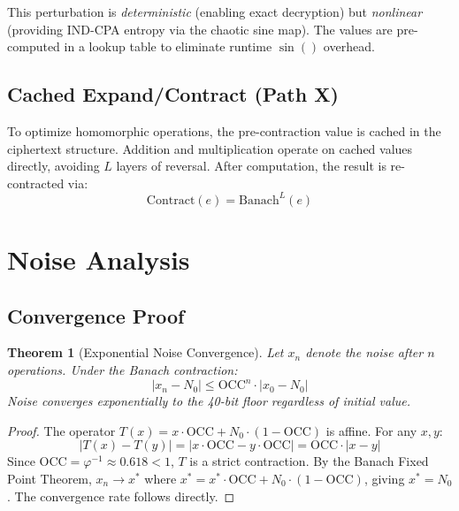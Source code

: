 \documentclass[11pt,a4paper]{article}
\newtheorem{theorem}{Theorem}[section]
\begin{document}
This perturbation is \textit{deterministic} (enabling exact decryption) but \textit{nonlinear} (providing IND-CPA entropy via the chaotic sine map). The values are pre-computed in a lookup table to eliminate runtime $\sin()$ overhead.

\subsection{Cached Expand/Contract (Path X)}

To optimize homomorphic operations, the pre-contraction value is cached in the ciphertext structure. Addition and multiplication operate on cached values directly, avoiding $L$ layers of reversal. After computation, the result is re-contracted via:
\begin{equation}
    \text{Contract}(e) = \text{Banach}^L(e)
\end{equation}

\section{Noise Analysis}
\label{sec:noise}

\subsection{Convergence Proof}

\begin{theorem}[Exponential Noise Convergence]
Let $x_n$ denote the noise after $n$ operations. Under the Banach contraction:
\begin{equation}
    |x_n - N_0| \leq \text{OCC}^n \cdot |x_0 - N_0|
\end{equation}
Noise converges exponentially to the 40-bit floor regardless of initial value.
\end{theorem}

\begin{proof}
The operator $T(x) = x \cdot \text{OCC} + N_0 \cdot (1 - \text{OCC})$ is affine. For any $x,y$:
\begin{equation}
    |T(x) - T(y)| = |x \cdot \text{OCC} - y \cdot \text{OCC}| = \text{OCC} \cdot |x - y|
\end{equation}
Since $\text{OCC} = \varphi^{-1} \approx 0.618 < 1$, $T$ is a strict contraction. By the Banach Fixed Point Theorem, $x_n \to x^*$ where $x^* = x^* \cdot \text{OCC} + N_0 \cdot (1 - \text{OCC})$, giving $x^* = N_0$. The convergence rate follows directly.
\end{proof}
\end{document}
